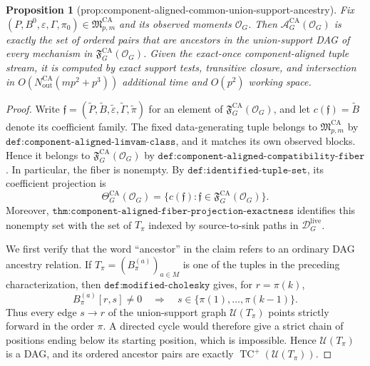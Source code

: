 \documentclass{article}
\newtheorem{proposition}{Proposition}
\begin{document}
\begin{proposition}[prop:component-aligned-common-union-support-ancestry]\label{prop:component-aligned-common-union-support-ancestry}
Fix \((P,B^0,\varepsilon,\Gamma,\pi_0)\in\mathfrak M_{p,m}^{\mathrm{CA}}\) and its observed moments \(\mathcal O_G\).  Then \(\mathcal A_G^{\mathrm{CA}}(\mathcal O_G)\) is exactly the set of ordered pairs that are ancestors in the union-support DAG of every mechanism in \(\mathfrak F_G^{\mathrm{CA}}(\mathcal O_G)\).  Given the exact-once component-aligned tuple stream, it is computed by exact support tests, transitive closure, and intersection in \(O(N_{\mathrm{out}}^{\mathrm{CA}}(mp^2+p^3))\) additional time and \(O(p^2)\) working space.
\end{proposition}
\begin{proof}
Write \(\mathfrak f=(\widetilde P,\widetilde B,
\widetilde\varepsilon,\widetilde\Gamma,\widetilde\pi)\) for an element of
\(\mathfrak F_G^{\mathrm{CA}}(\mathcal O_G)\), and let
\(c(\mathfrak f)=\widetilde B\) denote its coefficient family.  The fixed
data-generating tuple belongs to \(\mathfrak M_{p,m}^{\mathrm{CA}}\) by
\(\texttt{def:component-aligned-limvam-class}\), and it matches its own
observed blocks.  Hence it belongs to
\(\mathfrak F_G^{\mathrm{CA}}(\mathcal O_G)\) by
\(\texttt{def:component-aligned-compatibility-fiber}\).  In particular, the
fiber is nonempty.  By \(\texttt{def:identified-tuple-set}\), its coefficient
projection is
\[
 \Theta_G^{\mathrm{CA}}(\mathcal O_G)
 =\{c(\mathfrak f):
       \mathfrak f\in\mathfrak F_G^{\mathrm{CA}}(\mathcal O_G)\}.
 \tag{1}
\]
Moreover, \(\texttt{thm:component-aligned-fiber-projection-exactness}\)
identifies this nonempty set with the set of \(T_\pi\) indexed by
source-to-sink paths in \(\mathcal D_G^{\mathrm{live}}\).

We first verify that the word ``ancestor'' in the claim refers to an ordinary
DAG ancestry relation.  If \(T_\pi=(B_\pi^{(a)})_{a\in M}\) is one of the
tuples in the preceding characterization, then
\(\texttt{def:modified-cholesky}\) gives, for
\(r=\pi(k)\),
\[
 B_\pi^{(a)}[r,s]\ne0
 \quad\Longrightarrow\quad
 s\in\{\pi(1),\ldots,\pi(k-1)\}.
 \tag{2}
\]
Thus every edge \(s\to r\) of the union-support graph
\(\mathcal U(T_\pi)\) points strictly forward in the order \(\pi\).  A
directed cycle would therefore give a strict chain of positions ending below
its starting position, which is impossible.  Hence
\(\mathcal U(T_\pi)\) is a DAG, and its ordered ancestor pairs are exactly
\(\operatorname{TC}^{+}(\mathcal U(T_\pi))\).


\end{proof}
\end{document}
